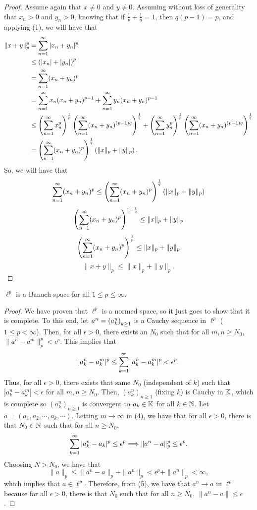 \begin{proof}
Assume again that $x \neq 0$ and $y \neq 0$. Assuming without loss of generality that $x_n > 0$ and $y_n > 0$, knowing that if $\frac{1}{p} + \frac{1}{q} = 1$, then $q(p - 1) = p$, and applying (1), we will have that
\begin{align*}
\| x + y \|_p^p &  = \sum\limits_{n = 1}^{\infty} |x_n + y_n|^p\\
& \leq \left( |x_n| + |y_n| \right)^p \\
& = \sum\limits_{n = 1}^{\infty} (x_n + y_n)^p \\
& = \sum\limits_{n = 1}^{\infty} x_n( x_n + y_n)^{p-1} + \sum\limits_{n = 1}^{\infty} y_n(x_n + y_n)^{p-1} \\
& \leq \left( \sum\limits_{n = 1}^{\infty} x_n^p \right)^{\frac{1}{p}} \left( \sum\limits_{n = 1}^{\infty} (x_n + y_n)^{(p-1)q} \right)^{\frac{1}{q}} + \left( \sum\limits_{n = 1}^{\infty} y_n^p \right)^{\frac{1}{p}} \left( \sum\limits_{n = 1}^{\infty} (x_n + y_n)^{(p-1)q} \right)^{\frac{1}{q}} \\
& =\left( \sum\limits_{n = 1}^{\infty} (x_n + y_n)^p \right)^{\frac{1}{q}} \left( \| x \|_p + \| y\|_p \right).
\end{align*}
So, we will have that 
\begin{equation}
\sum\limits_{n = 1}^{\infty} (x_n + y_n)^p \leq \left( \sum\limits_{n = 1}^{\infty} (x_n + y_n)^p \right)^{\frac{1}{q}} \left( \| x \|_p + \| y\|_p \right)
\end{equation}
\[ \left( \sum\limits_{n = 1}^{\infty} (x_n + y_n)^p \right)^{1 - \frac{1}{q}} \leq \|x \|_p + \| y \|_p \]
\[\left( \sum\limits_{n = 1}^{\infty} (x_n + y_n)^p \right)^{\frac{1}{p}} \leq \|x \|_p + \| y \|_p  \]
\[ \| x + y \|_p \leq \| x \|_p + \| y \|_p.\]
\end{proof}
\begin{theorem}
$\ell^p$ is a Banach space for all $1 \leq p \leq \infty$. 
\end{theorem}
\begin{proof}
We have proven that $\ell^p$ is a normed space, so it just goes to show that it is complete. To this end, let $a^n = \left( a_k^n \right)_{k \geq 1}$ is a Cauchy sequence in $\ell^p$ ($1 \leq p < \infty$). Then, for all $\epsilon > 0$, there exists an $N_0$ such that for all  $m, n \geq N_0$, $\| a^n  - a^m \|_p^p < \epsilon^p$. This implies that 
\begin{equation}
|a_k^n - a_k^m|^p \leq \sum\limits_{k = 1}^{\infty} |a_k^n - a_k^m|^p < \epsilon^p.
\end{equation}
Thus, for all $\epsilon > 0$, there exists that same $N_0$ (independent of $k$) such that $|a_k^n - a_k^m| < \epsilon$ for all $m, n \geq N_0$. Then, $(a_k^n )_{n \geq 1}$ (fixing $k$) is Cauchy in $\mathbb{K}$, which is complete so $(a_k^n)_{n \geq 1}$ is convergent to $a_k \in \mathbb{K}$ for all $k \in {\mathbb N}$. Let $a = (a_1, a_2, \cdots, a_k ,\cdots)$. Letting $m \to \infty$ in (4), we have that for all $\epsilon >0$, there is that $N_0 \in {\mathbb N}$ such that for all $n \geq N_0$, 
\begin{equation}
\sum\limits_{k = 1}^{\infty} | a_k^n - a_k |^p \leq \epsilon^p \Longrightarrow \| a^n - a \|_p^p \leq \epsilon^p.
\end{equation}
Choosing $N > N_0$, we have that 
\[ \| a \|_p \leq \| a^n - a \|_p + \| a^n \|_p < \epsilon^p + \| a^n \|_p < \infty,\]
which implies that $a \in \ell^p$. Therefore, from (5), we have that $a^n \to a$ in $\ell^p$ because for all $\epsilon > 0$, there is that $N_0$ such that for all $n \geq N_0$, $\| a^n  - a \| \leq \epsilon$. 
\end{proof}
